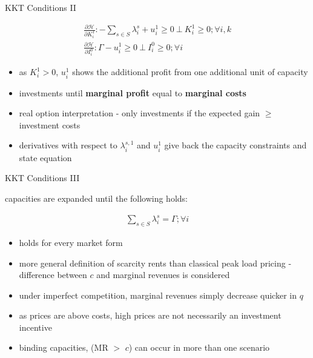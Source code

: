 \begin{frame}{KKT Conditions II}

\begin{gather}
\tfrac{\partial \mathcal{H}}{ \partial K^1_{i}}:  -\sum_{s\in S}  \lambda_{i}^{s} + u_{i}^1 \geq 0 \ \bot \ K^1_{i} \geq 0 ; \forall i,k \label{eq:foc3} \\
\tfrac{\partial \mathcal{H}}{ \partial I_{i}^{0}}: \Gamma - u_{i}^1 \geq 0 \ \bot \ I_{i}^{0} \geq 0 ;\forall i \label{eq:foc4}
\end{gather}

\begin{itemize}
	\item as $K^1_{i} > 0$, $u_{i}^1$ shows the additional profit from one additional unit of capacity
	\item investments until \textbf{marginal profit} equal to \textbf{marginal costs}
	\item real option interpretation - only investments if the expected gain $\geq$ investment costs
\end{itemize}

\begin{itemize}
	\item derivatives with respect to  $\lambda_{i}^{s,1}$ and $u_{i}^1$ give back the capacity constraints and state equation
\end{itemize}

\end{frame}

\begin{frame}{KKT Conditions III}

capacities are expanded until the following holds:

\begin{gather}
\sum_{s\in S}\lambda_{i}^{s} = \Gamma \label{eq:invcondition};  \forall i
\end{gather}

\begin{itemize}
	\item holds for every market form
	\item more general definition of scarcity rents than classical peak load pricing - difference between $c$ and marginal revenues is considered
	\item under imperfect competition, marginal revenues simply decrease quicker in $q$
	\item as prices are above costs, high prices are not necessarily an investment incentive
	\item binding capacities, (MR $>$ $c$) can occur in more than one scenario
\end{itemize}

\end{frame}

